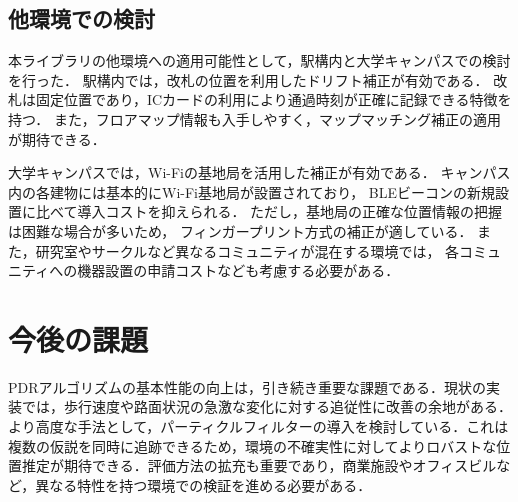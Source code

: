\documentclass[a4paper, 10pt, twocolumn]{jarticle}
\begin{document}
\subsection{他環境での検討}

本ライブラリの他環境への適用可能性として，駅構内と大学キャンパスでの検討を行った．
駅構内では，改札の位置を利用したドリフト補正が有効である．
改札は固定位置であり，ICカードの利用により通過時刻が正確に記録できる特徴を持つ．
また，フロアマップ情報も入手しやすく，マップマッチング補正の適用が期待できる．

大学キャンパスでは，Wi-Fiの基地局を活用した補正が有効である．
キャンパス内の各建物には基本的にWi-Fi基地局が設置されており，
BLEビーコンの新規設置に比べて導入コストを抑えられる．
ただし，基地局の正確な位置情報の把握は困難な場合が多いため，
フィンガープリント方式の補正が適している．
また，研究室やサークルなど異なるコミュニティが混在する環境では，
各コミュニティへの機器設置の申請コストなども考慮する必要がある．

\section{今後の課題}
PDRアルゴリズムの基本性能の向上は，引き続き重要な課題である．現状の実装では，歩行速度や路面状況の急激な変化に対する追従性に改善の余地がある．より高度な手法として，パーティクルフィルターの導入を検討している．これは複数の仮説を同時に追跡できるため，環境の不確実性に対してよりロバストな位置推定が期待できる．評価方法の拡充も重要であり，商業施設やオフィスビルなど，異なる特性を持つ環境での検証を進める必要がある．

\end{document}
